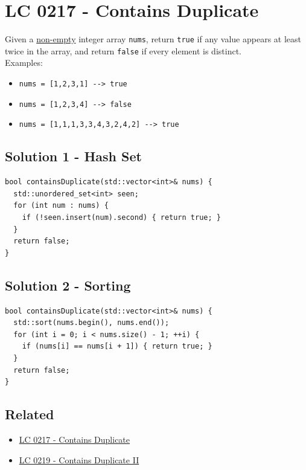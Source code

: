 \section{LC 0217 - Contains Duplicate}\label{lc0217}
Given a \ul{non-empty} integer array {\colorbox{CodeBackground}{\lstinline|nums|}}, return {\colorbox{CodeBackground}{\lstinline|true|}} if any value appears at least twice in the array, and return {\colorbox{CodeBackground}{\lstinline|false|}} if every element is distinct.\\

Examples:
\begin{itemize}
\item {\colorbox{CodeBackground}{\lstinline|nums = [1,2,3,1] --> true|}}
\item {\colorbox{CodeBackground}{\lstinline|nums = [1,2,3,4] --> false|}}
\item {\colorbox{CodeBackground}{\lstinline|nums = [1,1,1,3,3,4,3,2,4,2] --> true|}}
\end{itemize}

\subsection*{Solution 1 - Hash Set}
\begin{lstlisting}
bool containsDuplicate(std::vector<int>& nums) {
  std::unordered_set<int> seen;
  for (int num : nums) {
    if (!seen.insert(num).second) { return true; }
  }
  return false;
}
\end{lstlisting}

\subsection*{Solution 2 - Sorting}
\begin{lstlisting}
bool containsDuplicate(std::vector<int>& nums) {
  std::sort(nums.begin(), nums.end());
  for (int i = 0; i < nums.size() - 1; ++i) {
    if (nums[i] == nums[i + 1]) { return true; }
  }
  return false;
}
\end{lstlisting}

\subsection*{Related}
\begin{itemize}
\item \hyperref[lc0217]{LC 0217 - Contains Duplicate}
\item \hyperref[lc0219]{LC 0219 - Contains Duplicate II}
\end{itemize}

